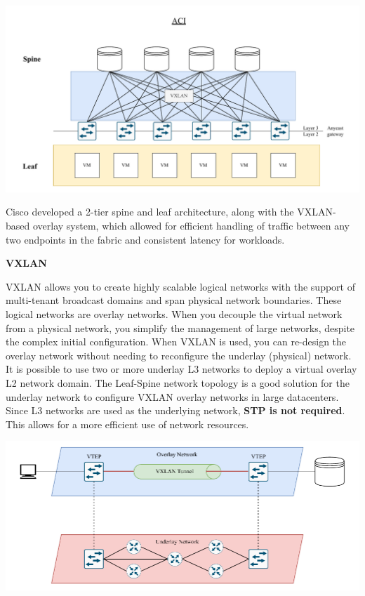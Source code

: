 \begin{center}
    \includegraphics[scale=0.6]{Pics/aci_topology.pdf}
\end{center}

Cisco developed a 2-tier spine and leaf architecture, along with the VXLAN-based overlay system, which allowed for efficient handling of traffic between any two endpoints in the fabric and consistent latency for workloads.
\newpage
\begin{note}
    \begin{center}
        \textbf{VXLAN}
    \end{center}
    VXLAN allows you to create highly scalable logical networks with the support of multi-tenant broadcast domains and span physical network boundaries. These logical networks are overlay networks. When you decouple the virtual network from a physical network, you simplify the management of large networks, despite the complex initial configuration. When VXLAN is used, you can re-design the overlay network without needing to reconfigure the underlay (physical) network. It is possible to use two or more underlay L3 networks to deploy a virtual overlay L2 network domain. The Leaf-Spine network topology is a good solution for the underlay network to configure VXLAN overlay networks in large datacenters. Since L3 networks are used as the underlying network, \textbf{STP is not required}. This allows for a more efficient use of network resources.

   \begin{center}
    \includegraphics[scale=0.6]{Pics/vxlan.pdf}
   \end{center} 
\end{note}

